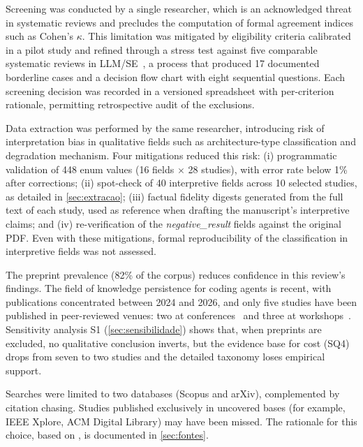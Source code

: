 Screening was conducted by a single researcher, which is an
acknowledged threat in systematic reviews and precludes the computation
of formal agreement indices such as Cohen's $\kappa$.
This limitation was mitigated by eligibility criteria calibrated in a
pilot study and refined through a stress test against five comparable
systematic reviews in
LLM/SE~\citep{hou2024llmse,zhang2024unifying,jin2024llmagents,wang2024llmagents,liu2024llmagents},
a process that produced 17 documented borderline cases and a decision
flow chart with eight sequential questions.
Each screening decision was recorded in a versioned spreadsheet with
per-criterion rationale, permitting retrospective audit of the
exclusions.

Data extraction was performed by the same researcher, introducing risk
of interpretation bias in qualitative fields such as architecture-type
classification and degradation mechanism.
Four mitigations reduced this risk: (i) programmatic validation of 448
enum values (16 fields $\times$ 28 studies), with error rate below 1\%
after corrections; (ii) spot-check of 40 interpretive fields across 10
selected studies, as detailed in \autoref{sec:extracao}; (iii) factual
fidelity digests generated from the full text of each study, used as
reference when drafting the manuscript's interpretive claims; and (iv)
re-verification of the \textit{negative\_result} fields against the
original PDF.
Even with these mitigations, formal reproducibility of the
classification in interpretive fields was not assessed.

The preprint prevalence (82\% of the corpus) reduces confidence in this
review's findings.
The field of knowledge persistence for coding agents is recent, with
publications concentrated between 2024 and 2026, and only five studies
have been published in peer-reviewed venues: two at
conferences~\citep{wang2026improving,zhang2025darwingodel} and three at
workshops~\citep{deshpande2025memtrack,shen2025talm,lindenbauer2025ctimrover}.
Sensitivity analysis S1 (\autoref{sec:sensibilidade}) shows that,
when preprints are excluded, no qualitative conclusion inverts, but the
evidence base for cost (SQ4) drops from seven to two studies and the
detailed taxonomy loses empirical support.

Searches were limited to two databases (Scopus and arXiv), complemented
by citation chasing.
Studies published exclusively in uncovered bases (for example, IEEE
Xplore, ACM Digital Library) may have been missed.
The rationale for this choice, based on \citet{mourao2020hybrid}, is
documented in \autoref{sec:fontes}.

